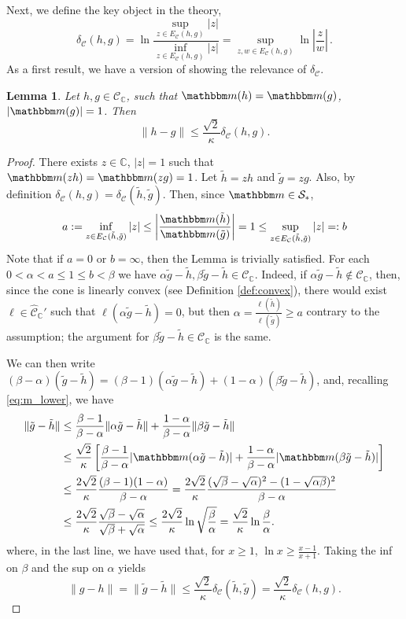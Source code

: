 \documentclass{amsart}
\numberwithin{equation}{section}
\newtheorem{lem}[thm]{Lemma}
\newcommand\cC{{\mathcal C}}
\newcommand\cS{{\mathcal S}}
\newcommand\bC{{\mathbb C}}
\newcommand{\bbm}{\mathbbm m}
\begin{document}
Next, we define the key object in the theory,
\begin{equation}\label{eq:gauge_dist}
\delta_\cC(h,g)=\ln\frac{\sup_{z\in E_\cC(h,g)}|z|}{\inf_{z\in E_\cC(h,g)}|z|}=\sup_{z,w\in E_\cC(h,g)}\ln\left|\frac z w\right| \, .
\end{equation}
As a first result, we have a version of \cite[Lemma 2.6]{Du09} showing the relevance of $\delta_\cC$.
\begin{lem}\label{lem:compare}
Let $h,g\in\cC_{\bC}$, such that $\bbm(h)=\bbm(g)$, $|\bbm(g)|=1$.
Then
\[
\|h-g\|\leq \frac{\sqrt2}{\kappa}\delta_{\cC}(h,g).
\]
\end{lem}
\begin{proof}
There exists $z\in\bC$, $|z|=1$ such that $\bbm(zh)=\bbm(zg)=1$. Let $\tilde h=z h$ and $\tilde g=z g$. Also, by definition $\delta_{\cC}(h,g)=\delta_{\cC}(\tilde h,\tilde g)$. Then, since $\bbm\in\cS_*$,
\[
a:=\inf_{z\in E_\cC(\tilde h,\tilde g)}|z|\leq \left|\frac{\bbm(\tilde h)}{\bbm(\tilde g)}\right|=1\leq \sup_{z\in E_\cC(\tilde h,\tilde g)}|z|=:b
\]
Note that if $a=0$ or $b=\infty$, then the Lemma is trivially satisfied. For each $0<\alpha<a\leq 1\leq b<\beta$  we have $\alpha\tilde g-\tilde h, \beta\tilde g-\tilde h\in\cC_\bC$. Indeed, if $\alpha\tilde g-\tilde h\not\in\cC_\bC$, then, since the cone is linearly convex (see Definition \ref{def:convex}), there would exist $\ell\in\hat\cC_{\bC}'$ such that $\ell(\alpha\tilde g-\tilde h)=0$, but then $\alpha=\frac{\ell(\tilde h)}{\ell(\tilde g)}\geq a$ contrary to the assumption; the argument for $\beta\tilde g-\tilde h\in\cC_\bC$ is the same.

We can then write $(\beta-\alpha)(\tilde g-\tilde h)=(\beta-1)(\alpha\tilde g-\tilde h)+(1-\alpha)(\beta\tilde g-\tilde h)$, and, recalling \eqref{eq:m_lower}, we have 
\[
\begin{split}
\|\tilde g-\tilde h\|&\leq \frac {\beta-1}{\beta-\alpha}\|\alpha\tilde g-\tilde h\|+\frac {1-\alpha}{\beta-\alpha}\|\beta\tilde g-\tilde h\|\\
&\leq \frac{\sqrt2}{\kappa}\left[ \frac {\beta-1}{\beta-\alpha}|\bbm(\alpha\tilde g-\tilde h)|+\frac {1-\alpha}{\beta-\alpha}|\bbm(\beta\tilde g-\tilde h)|\right]\\
&\leq \frac{2\sqrt2}{\kappa}\frac {(\beta-1)(1-\alpha)}{\beta-\alpha}=\frac{2\sqrt2}{\kappa}\frac {(\sqrt \beta-\sqrt \alpha)^2-(1-\sqrt{\alpha \beta})^2}{\beta-\alpha}\\
&\leq \frac{2\sqrt2}{\kappa}\frac {\sqrt \beta-\sqrt \alpha}{\sqrt \beta+\sqrt \alpha}\leq  \frac{2\sqrt2}{\kappa}\ln \sqrt{\frac \beta \alpha}
= \frac{\sqrt2}{\kappa}\ln \frac \beta \alpha.
\end{split}
\]
where, in the last line, we have used that, for $x\geq 1$, $\ln x\geq \frac{x-1}{x+1}$. Taking the inf on $\beta$ and the sup on $\alpha$ yields
\[
\|g-h\|=\|\tilde g-\tilde h\|\leq \frac{\sqrt2}{\kappa}\delta_{\cC}(\tilde h,\tilde g)=\frac{\sqrt2}{\kappa}\delta_{\cC}(h,g).
\]
\end{proof}
\end{document}
